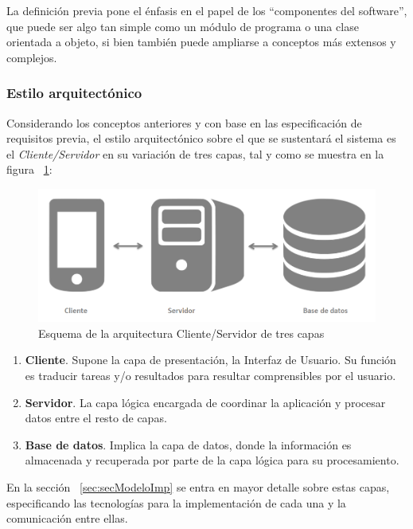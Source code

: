 La definición previa pone el énfasis en el papel de los “componentes del software”, que puede ser algo tan simple como un módulo de programa o una clase orientada a objeto, si bien también puede ampliarse a conceptos más extensos y complejos.

\subsubsection{Estilo arquitectónico}

Considerando los conceptos anteriores y con base en las especificación de requisitos previa, el estilo arquitectónico sobre el que se sustentará el sistema es el \emph{Cliente/Servidor} en su variación de tres capas, tal y como se muestra en la figura ~\ref{fig:arqClienteServ3Cap}:

\begin{figure}
	\centering
	\includegraphics[width=\linewidth,height=\textheight,keepaspectratio]{Images/ArqClienteServ3Cap}
	\caption{Esquema de la arquitectura Cliente/Servidor de tres capas}
	\label{fig:arqClienteServ3Cap}
\end{figure}

\begin{enumerate}
	\item \textbf{Cliente}. Supone la capa de presentación, la Interfaz de Usuario. Su función es traducir tareas y/o resultados para resultar comprensibles por el usuario.
	\item \textbf{Servidor}. La capa lógica encargada de coordinar la aplicación y procesar datos entre el resto de capas.
	\item \textbf{Base de datos}. Implica la capa de datos, donde la información es almacenada y recuperada por parte de la capa lógica para su procesamiento.
\end{enumerate}

En la sección ~\ref{sec:secModeloImp} se entra en mayor detalle sobre estas capas, especificando las tecnologías para la implementación de cada una y la comunicación entre ellas.

